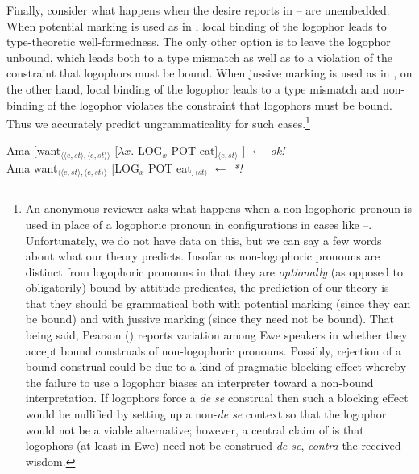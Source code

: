 \documentclass[output=paper,modfonts,nonflat]{langsci/langscibook}
\newcommand{\á}{\'{ã}}
\newcommand{\É}{\'{\~{ε}}}
\newcommand{\È}{\`{\~{ε}}}
\newcommand{\í}{\'{\~{i}}}
\newcommand{\ì}{\`{\~{i}}}
\newcommand{\Ó}{\'{\~{ɔ}}}
\newcommand{\Ò}{\`{\~{ɔ}}}
\newcommand{\ú}{\'{ũ}}
\newcommand{\ù}{\`{ũ}}
\begin{document}
Finally, consider what happens when the desire reports in -- are unembedded. When potential marking is used as in , local binding of the logophor leads to type-theoretic well-formedness. The only other option is to leave the logophor unbound, which leads both to a type mismatch as well as to a violation of the constraint that logophors must be bound. When jussive marking is used as in , on the other hand, local binding of the logophor leads to a type mismatch and non-binding of the logophor violates the constraint that logophors must be bound. Thus we accurately predict ungrammaticality for such cases.\footnote{An anonymous reviewer asks what happens when a non-logophoric pronoun is used in place of a logophoric pronoun in configurations in cases like --. Unfortunately, we do not have data on this, but we can say a few words about what our theory predicts. Insofar as non-logophoric pronouns are distinct from logophoric pronouns in that they are \emph{optionally} (as opposed to obligatorily) bound by attitude predicates, the prediction of our theory is that they should be grammatical both with potential marking (since they can be bound) and with jussive marking (since they need not be bound). That being said, Pearson (\citeyear[97]{Pearson2015}) reports variation among Ewe speakers in whether they accept bound construals of non-logophoric pronouns. Possibly, rejection of a bound construal could be due to a kind of pragmatic blocking effect whereby the failure to use a logophor biases an interpreter toward a non-bound interpretation. If logophors force a \emph{de se} construal then such a blocking effect would be nullified by setting up a non-\emph{de se} context so that the logophor would not be a viable alternative; however, a central claim of \cite{Pearson2015} is that logophors (at least in Ewe) need not be construed \emph{de se}, \emph{contra} the received wisdom.}



\ea \label{ex:grano:local':33}
    \begin{xlist}
    \ex Ama [want$_{\langle\langle e,st\rangle,\langle e,st\rangle\rangle}$ [$\lambda x$. LOG$_{x}$ POT eat]$_{\langle e,st\rangle}$ ] \hfill $\leftarrow$ \emph{ok!}\\
    \ex Ama want$_{\langle\langle e,st\rangle,\langle e,st\rangle\rangle}$ [LOG$_{x}$ POT eat]$_{\langle st\rangle}$  \hfill $\leftarrow$ \emph{*!} 
    \end{xlist}
\z
\end{document}
